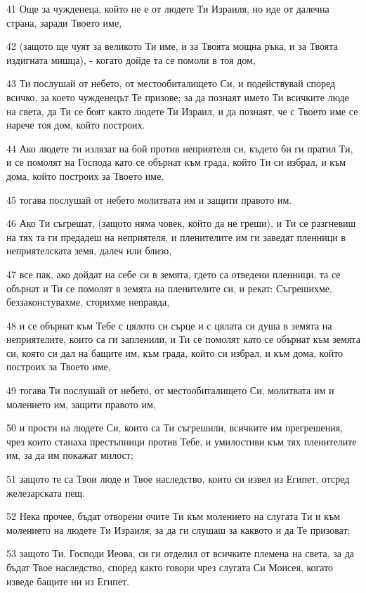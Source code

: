 \par 41 Още за чужденеца, който не е от людете Ти Израиля, но иде от далечна страна, заради Твоето име,
\par 42 (защото ще чуят за великото Ти име, и за Твоята мощна ръка, и за Твоята издигната мишца), - когато дойде та се помоли в тоя дом,
\par 43 Ти послушай от небето, от местообиталището Си, и подействувай според всичко, за което чужденецът Те призове; за да познаят името Ти всичките люде на света, да Ти се боят както людете Ти Израил, и да познаят, че с Твоето име се нарече тоя дом, който построих.
\par 44 Ако людете ти излязат на бой против неприятеля си, където би ги пратил Ти, и се помолят на Господа като се обърнат към града, който Ти си избрал, и към дома, който построих за Твоето име,
\par 45 тогава послушай от небето молитвата им и защити правото им.
\par 46 Ако Ти съгрешат, (защото няма човек, който да не греши), и Ти се разгневиш на тях та ги предадеш на неприятеля, и пленителите им ги заведат пленници в неприятелската земя, далеч или близо,
\par 47 все пак, ако дойдат на себе си в земята, гдето са отведени пленници, та се обърнат и Ти се помолят в земята на пленителите си, и рекат: Съгрешихме, беззаконстувахме, сторихме неправда,
\par 48 и се обърнат към Тебе с цялото си сърце и с цялата си душа в земята на неприятелите, които са ги запленили, и Ти се помолят като се обърнат към земята си, която си дал на бащите им, към града, който си избрал, и към дома, който построих за Твоето име,
\par 49 тогава Ти послушай от небето, от местообиталището Си, молитвата им и молението им, защити правото им,
\par 50 и прости на людете Си, които са Ти съгрешили, всичките им прегрешения, чрез които станаха престъпници против Тебе, и умилостиви към тях пленителите им, за да им покажат милост;
\par 51 защото те са Твои люде и Твое наследство, които си извел из Египет, отсред железарската пещ.
\par 52 Нека прочее, бъдат отворени очите Ти към молението на слугата Ти и към молението на людете Ти Израиля, за да ги слушаш за каквото и да Те призоват;
\par 53 защото Ти, Господи Иеова, си ги отделил от всичките племена на света, за да бъдат Твое наследство, според както говори чрез слугата Си Моисея, когато изведе бащите ни из Египет.
